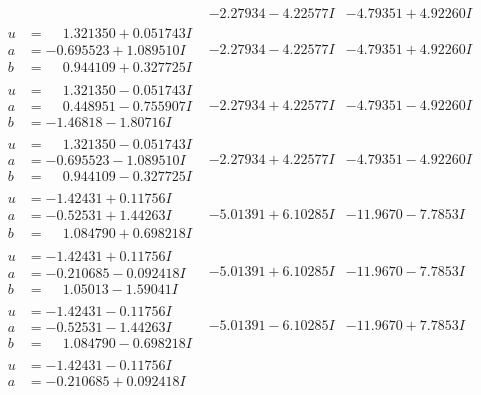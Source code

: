 \documentclass[1p]{elsarticle_modified}
\theoremstyle{definition}
\begin{document}
$$\begin{array}{c|c|c}
 & -2.27934 - 4.22577 I & -4.79351 + 4.92260 I \\ \hline\begin{aligned}
u &= \phantom{-}1.321350 + 0.051743 I \\
a &= -0.695523 + 1.089510 I \\
b &= \phantom{-}0.944109 + 0.327725 I\end{aligned}
 & -2.27934 - 4.22577 I & -4.79351 + 4.92260 I \\ \hline\begin{aligned}
u &= \phantom{-}1.321350 - 0.051743 I \\
a &= \phantom{-}0.448951 - 0.755907 I \\
b &= -1.46818 - 1.80716 I\end{aligned}
 & -2.27934 + 4.22577 I & -4.79351 - 4.92260 I \\ \hline\begin{aligned}
u &= \phantom{-}1.321350 - 0.051743 I \\
a &= -0.695523 - 1.089510 I \\
b &= \phantom{-}0.944109 - 0.327725 I\end{aligned}
 & -2.27934 + 4.22577 I & -4.79351 - 4.92260 I \\ \hline\begin{aligned}
u &= -1.42431 + 0.11756 I \\
a &= -0.52531 + 1.44263 I \\
b &= \phantom{-}1.084790 + 0.698218 I\end{aligned}
 & -5.01391 + 6.10285 I & -11.9670 - 7.7853 I \\ \hline\begin{aligned}
u &= -1.42431 + 0.11756 I \\
a &= -0.210685 - 0.092418 I \\
b &= \phantom{-}1.05013 - 1.59041 I\end{aligned}
 & -5.01391 + 6.10285 I & -11.9670 - 7.7853 I \\ \hline\begin{aligned}
u &= -1.42431 - 0.11756 I \\
a &= -0.52531 - 1.44263 I \\
b &= \phantom{-}1.084790 - 0.698218 I\end{aligned}
 & -5.01391 - 6.10285 I & -11.9670 + 7.7853 I \\ \hline\begin{aligned}
u &= -1.42431 - 0.11756 I \\
a &= -0.210685 + 0.092418 I \\

\end{aligned}
\end{array}$$
\end{document}
